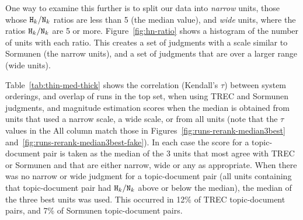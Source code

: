 One way to examine this further is to split our data into
\emph{narrow} units, those whose $\mbox{{\tt H$_k$}}/\mbox{{\tt N$_k$}}$ ratios are
less than 5 (the median value), and \emph{wide} units, where the
ratios $\mbox{{\tt H$_k$}}/\mbox{{\tt N$_k$}}$ are 5 or more.
Figure~\ref{fig:hn-ratio} shows a histogram of the number of units with each ratio.
This creates a set of judgments with a scale similar to Sormunen (the narrow units), and 
a set of judgments that are over a larger range (wide units).

Table~\ref{tab:thin-med-thick} shows the correlation (Kendall's
$\tau$) between system orderings, and overlap of runs in the top set,
when using TREC and Sormunen judgments, and magnitude estimation
scores when the median is obtained from units that used a narrow scale,
a wide scale, or from all units (note that the $\tau$ values in the All
column match those in Figures~\ref{fig:runs-rerank-median3best}
and~\ref{fig:runs-rerank-median3best-fake}).
In each case the score for a topic-document pair is taken as 
the median of the 3 units that most agree with TREC or Sormunen 
and that are either narrow, wide or any as appropriate.
When there was no narrow or wide judgment for a topic-document pair
(all units containing that topic-document pair had
$\mbox{{\tt H$_k$}}/\mbox{{\tt N$_k$}}$ above or below the median), the median of the three best units was used.
This occurred in 12\% of TREC topic-document pairs, and 7\% of Sormunen topic-document pairs.


